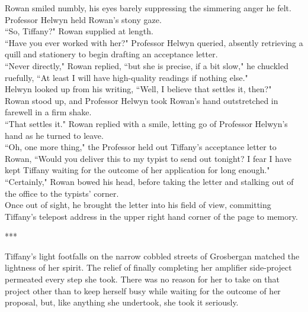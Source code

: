 Rowan smiled numbly, his eyes barely suppressing the simmering anger he felt. 
Professor Helwyn held Rowan's stony gaze.\\
``So, Tiffany?" Rowan supplied at length.\\
``Have you ever worked with her?" Professor Helwyn queried, absently retrieving a quill and stationery to begin drafting an acceptance letter.\\
``Never directly," Rowan replied, ``but she is precise, if a bit slow," he chuckled ruefully, ``At least I will have high-quality readings if nothing else."\\
Helwyn looked up from his writing, ``Well, I believe that settles it, then?"\\
Rowan stood up, and Professor Helwyn took Rowan's hand outstretched in farewell in a firm shake.\\
``That settles it." Rowan replied with a smile, letting go of Professor Helwyn's hand as he turned to leave.\\
``Oh, one more thing," the Professor held out Tiffany's acceptance letter to Rowan, ``Would you deliver this to my typist to send out tonight? I fear I have kept Tiffany waiting for the outcome of her application for long enough."\\
``Certainly," Rowan bowed his head, before taking the letter and stalking out of the office to the typists' corner.\\

Once out of sight, he brought the letter into his field of view, committing Tiffany's telepost address in the upper right hand corner of the page to memory.

\begin{center}
***
\end{center}

Tiffany's light footfalls on the narrow cobbled streets of Grosbergan matched the lightness of her spirit.
The relief of finally completing her amplifier side-project permeated every step she took.
There was no reason for her to take on that project other than to keep herself busy while waiting for the outcome of her proposal, but, like anything she undertook, she took it seriously.\\

